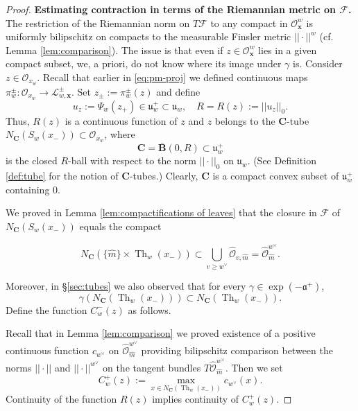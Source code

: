 \documentclass[12pt]{amsbook}%
\theoremstyle{definition}
\theoremstyle{remark}
\numberwithin{section}{chapter}
\numberwithin{subsection}{section}
\numberwithin{figure}{chapter}
\DeclareMathOperator{\Th}{Th}
\def\cF{{\mathscr{F}}}
\def\cO{{\mathscr{O}}}
\def\CC{{\mathbf{C}}}
\def\bx{\mathbf{x}}
\def\ga{\gamma}
\def\cL{{\mathscr{L}}}
\begin{document}
{{\begin{proof}
\medskip 
{\bf Estimating contraction in terms of the Riemannian metric on $\cF$.}  
The restriction of 
the Riemannian norm on $T\cF$ to any compact in $\cO^w_{\bx}$  is uniformly bilipschitz on compacts to the measurable Finsler metric  
$||\cdot||^w$ (cf. Lemma \ref{lem:comparison}). The issue is that even if $z\in \cO^w_{\bx}$
 lies in a given compact subset, we, a priori, do not know where its image under $\ga$ is. Consider 
 $z\in \cO_{x_w}$. Recall that earlier in \eqref{eq:pm-proj} we defined continuous maps $\pi_{w}^{\pm}: \cO_{x_w}\to \cL^\pm_{w,\bx}$. 
 Set $z_\pm:= \pi_{w}^{\pm}(z)$  and define 
 $$
 u_z:= \Psi_w(z_+)\in \mathfrak{u}_w^+\subset 
 \mathfrak{u}_w, \quad R=R(z):= ||u_z||_0. 
 $$
 Thus, $R(z)$ is a continuous function of $z$ and $z$ belongs to the $\CC$-tube $N_{\CC}(S_{w}(x_-))\subset \cO_{x_w}$, where 
$$
\CC=\bar{\mathbf{B}}(0, R)\subset \mathfrak{u}^+_w
$$ 
is the closed $R$-ball with respect to the norm $||\cdot||_0$ on $ \mathfrak{u}_w$. 
(See Definition \ref{def:tube} for the notion of $\CC$-tubes.) 
Clearly, $\CC$ is a compact convex subset of $\mathfrak{u}^+_w$ containing $0$. 

We proved in Lemma \ref{lem:compactifications of leaves} 
that the closure in $\cF$ of $N_{\CC}(S_{w}(x_-))$ equals the compact 

{$$
N_{\CC}(\{\hat{m} \} \times \Th_{w}(x_-))\subset \bigcup_{v\geq w^\vee}\hat{\cO}_{v, \hat{m}}=\hat{\cO}_{\hat{m}}^{w^\vee}.$$}
 
Moreover, in \S \ref{sec:tubes} we also observed that 
for every $\gamma\in \exp(- \mathfrak{a}^+)$, 
$$
\ga(N_{\CC}(\Th_{w}(x_-)))\subset N_{\CC}(\Th_{w}(x_-)).$$
Define the function $C_w^-(z)$ as follows.


Recall that in Lemma \ref{lem:comparison} we proved existence of a positive continuous function $c_{w^\vee}$ 
on $\hat{\cO}^{w^\vee}_{\hat{m}}$ providing bilipschitz comparison between the norms $||\cdot||$ and $||\cdot||^{w^\vee}$ on the tangent bundles $T\hat{\cO}_{\hat{m}}^{w^\vee}$. 
Then we set
$$
C_w^+(z):=\max_{x\in N_{\CC}(\Th_{w}(x_-))} c_{w^\vee}(x). 
$$
Continuity of the function $R(z)$ implies continuity of $C_w^+(z)$.
 

\end{proof}}}
\end{document}
